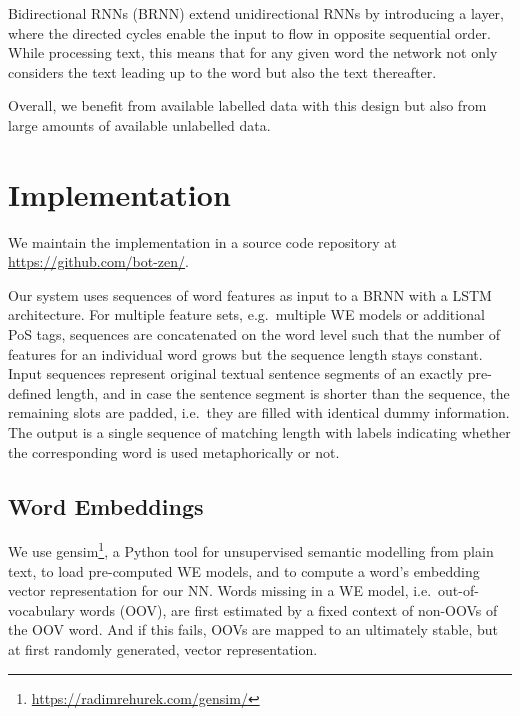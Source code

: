 \documentclass[11pt,a4paper]{article}
\begin{document}
Bidirectional RNNs (BRNN) \cite{Schuster1997BidirectionalNetworks} extend unidirectional RNNs by introducing a layer, where the directed cycles enable the input to flow in opposite sequential order. 
While processing text, this means that for any given word the network not only considers the text leading up to the word but also the text thereafter.

Overall, we benefit from available labelled data with this design but
also from large amounts of available unlabelled data.


\section{Implementation} %
\label{sec:implementation}

We maintain the implementation in a source code repository at
\url{https://github.com/bot-zen/}.  

Our system uses sequences of word features as input to a BRNN with a LSTM architecture.
For multiple feature sets, e.g.~multiple WE models or additional PoS tags, sequences are concatenated on the word level such that the number of features for an individual word grows but the sequence length stays constant.
Input sequences represent original textual sentence segments of an exactly pre-defined length, and in case the sentence segment is shorter than the sequence, the remaining slots are padded, i.e.~they are filled with identical dummy information.
The output is a single sequence of matching length with labels indicating whether the corresponding word is used metaphorically or not.


\subsection{Word Embeddings} %

We use gensim\footnote{\url{https://radimrehurek.com/gensim/}}, a Python tool for unsupervised semantic modelling from plain text, to load pre-computed WE models, and to compute a word's embedding vector representation for our NN. 
Words missing in a WE model, i.e.~out-of-vocabulary words (OOV), are first estimated by a fixed context of non-OOVs of the OOV word.
And if this fails, OOVs are mapped to an ultimately stable, but at first randomly generated, vector representation.
\end{document}
